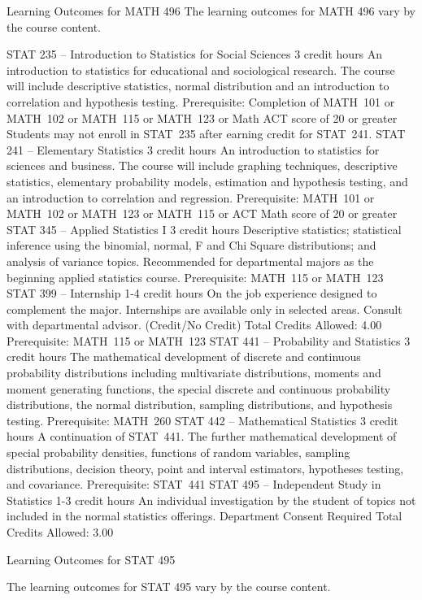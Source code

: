 Learning Outcomes for MATH 496
The learning outcomes for MATH 496 vary by the course content.

STAT 235 – Introduction to Statistics for Social Sciences 3 credit hours
An introduction to statistics for educational and sociological research. The course will include descriptive statistics, normal distribution and an introduction to correlation and hypothesis testing.
Prerequisite: Completion of MATH 101 or MATH 102 or MATH 115 or MATH 123 or Math ACT score of 20 or greater Students may not enroll in STAT 235 after earning credit for STAT 241.
STAT 241 – Elementary Statistics 3 credit hours
An introduction to statistics for sciences and business. The course will include graphing techniques, descriptive statistics, elementary probability models, estimation and hypothesis testing, and an introduction to correlation and regression.
Prerequisite: MATH 101 or MATH 102 or MATH 123 or MATH 115 or ACT Math score of 20 or greater
STAT 345 – Applied Statistics I 3 credit hours
Descriptive statistics; statistical inference using the binomial, normal, F and Chi Square distributions; and analysis of variance topics. Recommended for departmental majors as the beginning applied statistics course.
Prerequisite: MATH 115 or MATH 123
STAT 399 – Internship 1-4 credit hours
On the job experience designed to complement the major. Internships are available only in selected areas. Consult with departmental advisor. (Credit/No Credit)
Total Credits Allowed: 4.00
Prerequisite: MATH 115 or MATH 123
STAT 441 – Probability and Statistics 3 credit hours
The mathematical development of discrete and continuous probability distributions including multivariate distributions, moments and moment generating functions, the special discrete and continuous probability distributions, the normal distribution, sampling distributions, and hypothesis testing.
Prerequisite: MATH 260
STAT 442 – Mathematical Statistics 3 credit hours
A continuation of STAT 441. The further mathematical development of special probability densities, functions of random variables, sampling distributions, decision theory, point and interval estimators, hypotheses testing, and covariance.
Prerequisite: STAT 441
STAT 495 – Independent Study in Statistics 1-3 credit hours
An individual investigation by the student of topics not included in the normal statistics offerings.
Department Consent Required
Total Credits Allowed: 3.00

Learning Outcomes for STAT 495

The learning outcomes for STAT 495 vary by the course content.


